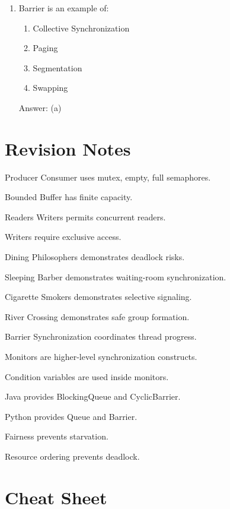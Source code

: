 \begin{enumerate}
\item Barrier is an example of:
\begin{enumerate}[label=(\alph*)]
\item Collective Synchronization
\item Paging
\item Segmentation
\item Swapping
\end{enumerate}
Answer: (a)
\end{enumerate}

\section{Revision Notes}

\begin{revisionnotes}
\item Producer Consumer uses mutex, empty, full semaphores.
\item Bounded Buffer has finite capacity.
\item Readers Writers permits concurrent readers.
\item Writers require exclusive access.
\item Dining Philosophers demonstrates deadlock risks.
\item Sleeping Barber demonstrates waiting-room synchronization.
\item Cigarette Smokers demonstrates selective signaling.
\item River Crossing demonstrates safe group formation.
\item Barrier Synchronization coordinates thread progress.
\item Monitors are higher-level synchronization constructs.
\item Condition variables are used inside monitors.
\item Java provides BlockingQueue and CyclicBarrier.
\item Python provides Queue and Barrier.
\item Fairness prevents starvation.
\item Resource ordering prevents deadlock.
\end{revisionnotes}

\section{Cheat Sheet}

